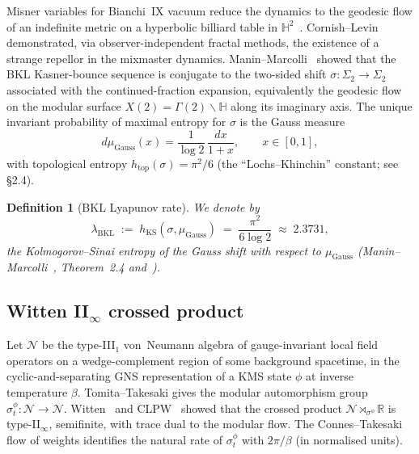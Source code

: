 \documentclass[12pt,a4paper]{article}
\newtheorem{definition}[theorem]{Definition}
\begin{document}
Misner variables for Bianchi~IX vacuum reduce the dynamics to the
geodesic flow of an indefinite metric on a hyperbolic billiard table
in $\mathbb{H}^2$~\cite{DamourHenneauxNicolai2002}.
Cornish--Levin~\cite{CornishLevin1996} demonstrated, via observer-independent
fractal methods, the existence of a strange repellor in the
mixmaster dynamics.
Manin--Marcolli~\cite{ManinMarcolli2015} showed that the BKL
Kasner-bounce sequence is conjugate to the two-sided shift
$\sigma:\Sigma_2\to\Sigma_2$ associated with the continued-fraction
expansion, equivalently the geodesic flow on the modular surface
$X(2) = \Gamma(2)\backslash\mathbb{H}$ along its imaginary axis.
The unique invariant probability of maximal entropy for $\sigma$ is
the Gauss measure
\begin{equation}
  d\mu_{\mathrm{Gauss}}(x)
  = \frac{1}{\log 2}\,\frac{dx}{1+x},\qquad x\in[0,1],
  \label{eq:gauss-measure}
\end{equation}
with topological entropy $h_{\mathrm{top}}(\sigma) = \pi^2/6$ (the
``Lochs--Khinchin'' constant; see~\cite{ManinMarcolli2015} \S2.4).

\begin{definition}[BKL Lyapunov rate]\label{def:lambda-BKL}
We denote by
\begin{equation}
  \lambda_{\mathrm{BKL}}
  \;:=\; h_{\mathrm{KS}}(\sigma,\mu_{\mathrm{Gauss}})
  \;=\; \frac{\pi^2}{6\log 2}
  \;\approx\; 2.3731,
  \label{eq:lambda-BKL}
\end{equation}
the Kolmogorov--Sinai entropy of the Gauss shift with respect to
$\mu_{\mathrm{Gauss}}$ (Manin--Marcolli~\cite{ManinMarcolli2015},
Theorem~2.4 and~\cite{FFM2015}).
\end{definition}

\subsection{Witten II$_\infty$ crossed product}\label{ssec:Witten}

Let $\mathcal{N}$ be the type-III$_1$ von~Neumann algebra of
gauge-invariant local field operators on a wedge-complement region of
some background spacetime, in the cyclic-and-separating GNS
representation of a KMS state $\phi$ at inverse temperature $\beta$.
Tomita--Takesaki gives the modular automorphism group
$\sigma_t^\phi:\mathcal{N}\to\mathcal{N}$.
Witten~\cite{Witten2022} and CLPW~\cite{CLPW2022}
showed that the crossed product
$\mathcal{N}\rtimes_{\sigma^\phi}\mathbb{R}$
is type-II$_\infty$, semifinite, with trace dual to the modular flow.
The Connes--Takesaki flow of weights identifies the natural rate
of $\sigma_t^\phi$ with $2\pi/\beta$ (in normalised units).
\end{document}
